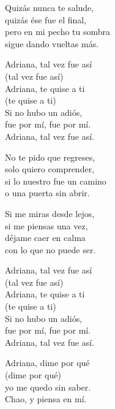 \begin{lyrics}
Quizás nunca te salude,\\
quizás ése fue el final,\\
pero en mi pecho tu sombra\\
sigue dando vueltas más.

Adriana, tal vez fue así\\
(tal vez fue así)\\
Adriana, te quise a ti\\
(te quise a ti)\\
Si no hubo un adiós,\\
fue por mí, fue por mí.\\
Adriana, tal vez fue así.

No te pido que regreses,\\
solo quiero comprender,\\
si lo nuestro fue un camino\\
o una puerta sin abrir.

Si me miras desde lejos,\\
si me piensas una vez,\\
déjame caer en calma\\
con lo que no puede ser.

Adriana, tal vez fue así\\
(tal vez fue así)\\
Adriana, te quise a ti\\
(te quise a ti)\\
Si no hubo un adiós,\\
fue por mí, fue por mí.\\
Adriana, tal vez fue así.

Adriana, dime por qué\\
(dime por qué)\\
yo me quedo sin saber.\\
Chao, y piensa en mí.

\end{lyrics}


